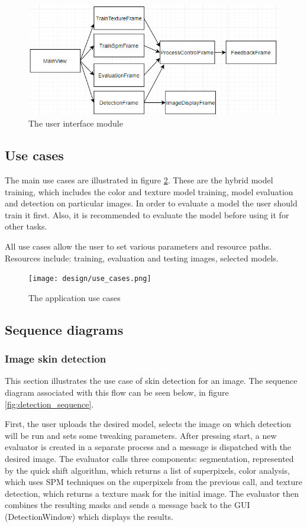 \documentclass[12pt]{report}
\begin{document}
	\begin{figure}[h!]
		\centering
		\includegraphics[]{design/gui.png}
		\caption{The user interface module}
		\label{fig:gui}
	\end{figure}

	\clearpage
	\subsection{Use cases}
	The main use cases are illustrated in figure \ref{fig:use_cases}. These are the hybrid model training, which includes the color and texture model training, model evaluation and detection on particular images. In order to evaluate a model the user should train it first. Also, it is recommended to evaluate the model before using it for other tasks.
	
	All use cases allow the user to set various parameters and resource paths. Resources include: training, evaluation and testing images, selected models.
	
	\begin{figure}[h!]
		\centering
		\texttt{[image: design/use\_cases.png]}
		\caption{The application use cases}
		\label{fig:use_cases}
	\end{figure}

	\clearpage
	\subsection{Sequence diagrams}
	
	\subsubsection{Image skin detection}
	This section illustrates the use case of skin detection for an image. The sequence diagram associated with this flow can be seen below, in figure \ref{fig:detection_sequence}. 
	
	First, the user uploads the desired model, selects the image on which detection will be run and sets some tweaking parameters. After pressing start, a new evaluator is created in a separate process and a message is dispatched with the desired image. The evaluator calls three components: segmentation, represented by the quick shift algorithm, which returns a list of superpixels, color analysis, which uses SPM techniques on the superpixels from the previous call, and texture detection, which returns a texture mask for the initial image. The evaluator then combines the resulting masks and sends a message back to the GUI (DetectionWindow) which displays the results.
	
\end{document}

